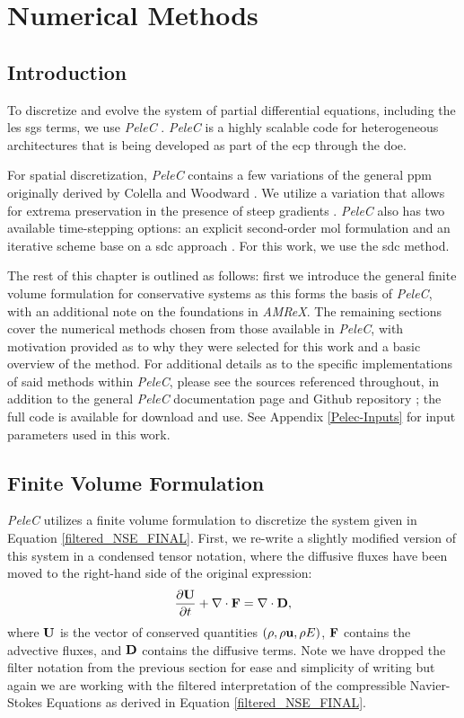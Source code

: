 \chapter{Numerical Methods}
\section{Introduction}
To discretize and evolve the system of partial differential equations, including the \gls{les} \gls{sgs} terms, we use \textit{PeleC} \cite{PeleC1, PeleC2}. \textit{PeleC} is a highly scalable code for heterogeneous architectures that is being developed as part of the \gls{ecp} through the \gls{doe}. 

For spatial discretization, \textit{PeleC} contains a few variations of the general \gls{ppm} originally derived by Colella and Woodward \cite{1984JCoPPPM}. We utilize a variation that allows for extrema preservation in the presence of steep gradients \cite{MILLER200226, COLELLA20087069}. \textit{PeleC} also has two available time-stepping options: an explicit second-order \gls{mol} formulation and an iterative scheme base on a \gls{sdc} approach \cite{SDC_PeleC}. For this work, we use the \gls{sdc} method. 

The rest of this chapter is outlined as follows: first we introduce the general finite volume formulation for conservative systems as this forms the basis of \textit{PeleC}, with an additional note on the foundations in \textit{AMReX}. The remaining sections cover the numerical methods chosen from those available in \textit{PeleC}, with motivation provided as to why they were selected for this work and a basic overview of the method. For additional details as to the specific implementations of said methods within \textit{PeleC}, please see the sources referenced throughout, in addition to the general \textit{PeleC} documentation page \cite{PeleC_doc} and Github repository \cite{PeleC_Github}; the full code is available for download and use. See Appendix \ref{Pelec-Inputs} for input parameters used in this work.  

\section{Finite Volume Formulation} \label{FVM_section}
\textit{PeleC} utilizes a finite volume formulation \cite{finite_volume_ref} to discretize the system given in Equation \eqref{filtered_NSE_FINAL}. First, we re-write a slightly modified version of this system in a condensed tensor notation, where the diffusive fluxes have been moved to the right-hand side of the original expression: 
\begin{equation} \label{NSE_tensor}
\dfrac{\partial \vb{U}}{\partial t} + \nabla \cdot \vb{F} = \nabla \cdot \vb{D},
\end{equation}
where $\vb{U}$ is the vector of conserved quantities $(\rho, \rho \vb{u}, \rho E)$, $\vb{F}$ contains the advective fluxes, and $\vb{D}$ contains the diffusive terms. Note we have dropped the filter notation from the previous section for ease and simplicity of writing but again we are working with the filtered interpretation of the compressible Navier-Stokes Equations as derived in Equation \eqref{filtered_NSE_FINAL}. 

